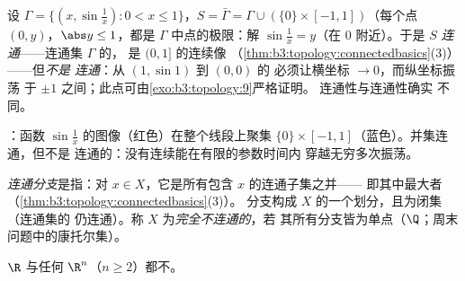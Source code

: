 \begin{example}[拓扑学家的正弦曲线]
\label{ex:b3:topology:sinecurve}
设 $\Gamma = \{(x, \sin\frac1x) : 0 < x \leq 1\}$，$S =
\bar\Gamma = \Gamma \cup (\{0\}\times[-1,1])$（每个点 $(0,
y)$，$\abs y \leq 1$，都是 $\Gamma$ 中点的极限：解
$\sin\frac1x = y$（在 $0$ 附近）。于是 $S$
\emph{连通}——连通集 $\Gamma$ 的，
是 $(0, 1]$ 的连续像
（\cref{thm:b3:topology:connectedbasics}(3)）——但\emph{不是
连通}：从 $(1, \sin 1)$ 到 $(0,0)$ 的
必须让横坐标 $\to 0$，而纵坐标振荡
于 $\pm1$ 之间；此点可由\cref{exo:b3:topology:9}严格证明。
连通性与连通性确实
不同。
\end{example}

\begin{omfigure}

{\small {}：函数
$\sin\frac1x$ 的图像（红色）在整个线段上聚集
$\{0\}\times[-1,1]$（蓝色）。并集连通，但不是
连通的：没有连续能在有限的参数时间内
穿越无穷多次振荡。}
\end{omfigure}

\begin{definition}\label{def:b3:topology:components}
\emph{连通分支}是指：对 $x
\in X$，它是所有包含 $x$ 的连通子集之并——
即其中最大者（\cref{thm:b3:topology:connectedbasics}(3)）。
分支构成 $X$ 的一个划分，且为闭集（连通集的
仍连通）。称 $X$ 为\emph{完全不连通的}，若
其所有分支皆为单点（$\Q$；周末
问题中的康托尔集）。
\end{definition}

\begin{theorem}\label{thm:b3:topology:rnotr2}
$\R$ 与任何 $\R^n$（$n \geq 2$）都不。
\end{theorem}

